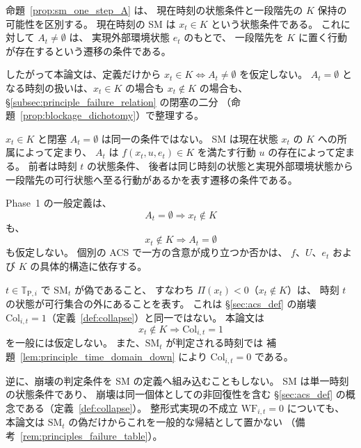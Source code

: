 \begin{remark}
\label{rem:sm_current_next}
命題~\ref{prop:sm_one_step_A} は、
現在時刻の状態条件と一段階先の $K$ 保持の可能性を区別する。
現在時刻の SM は $x_t\in K$ という状態条件である。
これに対して $A_t\neq\emptyset$ は、
実現外部環境状態 $e_t$ のもとで、
一段階先を $K$ に置く行動が存在するという遷移の条件である。

したがって本論文は、定義だけから
$x_t\in K \iff A_t\neq\emptyset$
を仮定しない。
$A_t=\emptyset$ となる時刻の扱いは、$x_t\in K$ の場合も $x_t\notin K$ の場合も、
\S\ref{subsec:principle_failure_relation} の閉塞の二分
（命題~\ref{prop:blockage_dichotomy}）で整理する。
\end{remark}

\begin{remark}[SM と閉塞の論理的区別]
\label{rem:sm_blockage_distinction}
$x_t\in K$ と閉塞 $A_t=\emptyset$ は同一の条件ではない。
SM は現在状態 $x_t$ の $K$ への所属によって定まり、
$A_t$ は $f(x_t,u,e_t)\in K$ を満たす行動 $u$ の存在によって定まる。
前者は時刻 $t$ の状態条件、
後者は同じ時刻の状態と実現外部環境状態から
一段階先の可行状態へ至る行動があるかを表す遷移の条件である。

Phase~1 の一般定義は、
\[
  A_t=\emptyset
  \Longrightarrow
  x_t\notin K
\]
も、
\[
  x_t\notin K
  \Longrightarrow
  A_t=\emptyset
\]
も仮定しない。
個別の ACS で一方の含意が成り立つか否かは、
$f$、$U$、$e_t$ および $K$ の具体的構造に依存する。
\end{remark}

\begin{remark}[SM の時刻別充足述語が偽であることと崩壊の区別]
\label{rem:sm_not_collapse}
$t\in\mathbb{T}_{\mathrm{P},i}$ で $\mathrm{SM}_t$ が偽であること、
すなわち $\Pi(x_t)<0$（$x_t\notin K$）は、
時刻 $t$ の状態が可行集合の外にあることを表す。
これは \S\ref{sec:acs_def} の崩壊 $\mathrm{Col}_{i,t}=1$（定義~\ref{def:collapse}）と同一ではない。
本論文は
\[
  x_t\notin K
  \Longrightarrow
  \mathrm{Col}_{i,t}=1
\]
を一般には仮定しない。
また、$\mathrm{SM}_t$ が判定される時刻では
補題~\ref{lem:principle_time_domain_down} により $\mathrm{Col}_{i,t}=0$ である。

逆に、崩壊の判定条件を SM の定義へ組み込むこともしない。
SM は単一時刻の状態条件であり、
崩壊は同一個体としての非回復性を含む \S\ref{sec:acs_def} の概念である（定義~\ref{def:collapse}）。
整形式実現の不成立 $\mathrm{WF}_{i,t}=0$ についても、
本論文は $\mathrm{SM}_t$ の偽だけからこれを一般的な帰結として置かない
（備考~\ref{rem:principles_failure_table}）。
\end{remark}


